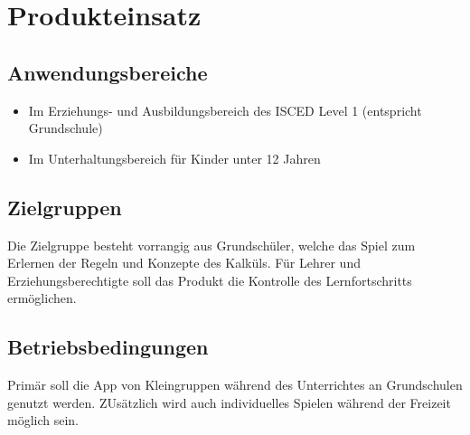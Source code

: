 \section{Produkteinsatz}

\subsection{Anwendungsbereiche}
\begin{itemize}
	\item Im Erziehungs- und Ausbildungsbereich des ISCED Level 1 (entspricht Grundschule)
	\item Im Unterhaltungsbereich für Kinder unter 12 Jahren
\end{itemize}


\subsection{Zielgruppen}
Die Zielgruppe besteht vorrangig aus Grundschüler, welche das Spiel zum Erlernen der Regeln und Konzepte des Kalküls. Für Lehrer und Erziehungsberechtigte soll das Produkt die Kontrolle des Lernfortschritts ermöglichen.

\subsection{Betriebsbedingungen}
Primär soll die App von Kleingruppen während des Unterrichtes an Grundschulen genutzt werden. ZUsätzlich wird auch individuelles Spielen während der Freizeit möglich sein.

